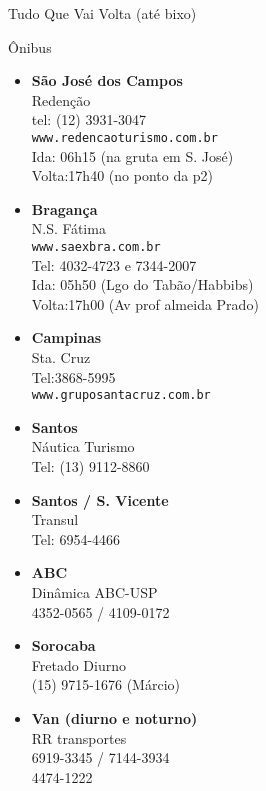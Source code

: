 \begin{secao}{Tudo Que Vai Volta (até bixo)}
\begin{subsecao}{Ônibus}
\begin{itemize}
  \item {\bf São José dos Campos}\\
    Redenção\\
    tel: (12) 3931-3047\\
    {\tt www.redencaoturismo.com.br}\\
    Ida: 06h15 (na gruta em S. José)\\
    Volta:17h40 (no ponto da p2)

  \item {\bf Bragança}\\
    N.S. Fátima\\
    {\tt www.saexbra.com.br}\\
    Tel: 4032-4723 e 7344-2007\\
    Ida: 05h50 (Lgo do Tabão/Habbibs)\\
    Volta:17h00 (Av prof almeida Prado)

  \item {\bf Campinas}\\
    Sta. Cruz\\
    Tel:3868-5995\\
    {\tt www.gruposantacruz.com.br}

  \item {\bf Santos}\\
    Náutica Turismo\\
    Tel: (13) 9112-8860

  \item {\bf Santos / S. Vicente}\\
    Transul\\
    Tel: 6954-4466

  \item {\bf ABC}\\
    Dinâmica ABC-USP\\
    4352-0565 / 4109-0172

  \item {\bf Sorocaba}\\
    Fretado Diurno\\
    (15) 9715-1676 (Márcio)

  \item {\bf Van (diurno e noturno)}\\
    RR transportes\\
    6919-3345 / 7144-3934\\
    4474-1222 \\

\end{itemize}


\end{subsecao}
\end{secao}
